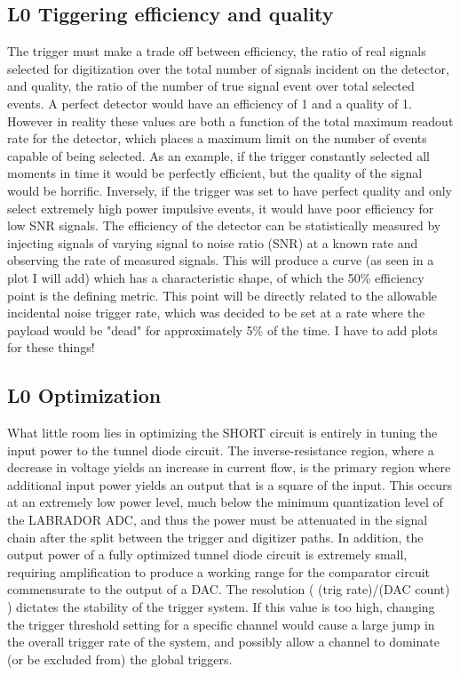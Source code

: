 	\subsection{L0 Tiggering efficiency and quality}
		The trigger must make a trade off between efficiency, the ratio of real signals selected for digitization over the total number of signals incident on the detector, and quality, the ratio of the number of true signal event over total selected events.  A perfect detector would have an efficiency of 1 and a quality of 1.  However in reality these values are both a function of the total maximum readout rate for the detector, which places a maximum limit on the number of events capable of being selected.  As an example, if the trigger constantly selected all moments in time it would be perfectly efficient, but the quality of the signal would be horrific.  Inversely, if the trigger was set to have perfect quality and only select extremely high power impulsive events, it would have poor efficiency for low SNR signals.  The efficiency of the detector can be statistically measured by injecting signals of varying signal to noise ratio (SNR) at a known rate and observing the rate of measured signals.  This will produce a curve (as seen in a plot I will add) which has a characteristic shape, of which the 50\% efficiency point is the defining metric.  This point will be directly related to the allowable incidental noise trigger rate, which was decided to be set at a rate where the payload would be "dead" for approximately 5\% of the time.  I have to add plots for these things!
		
	\subsection{L0 Optimization}
		What little room lies in optimizing the SHORT circuit is entirely in tuning the input power to the tunnel diode circuit.  The inverse-resistance region, where a decrease in voltage yields an increase in current flow, is the primary region where additional input power yields an output that is a square of the input.  This occurs at an extremely low power level, much below the minimum quantization level of the LABRADOR ADC, and thus the power must be attenuated in the signal chain after the split between the trigger and digitizer paths.  In addition, the output power of a fully optimized tunnel diode circuit is extremely small,	requiring amplification to produce a working range for the comparator circuit commensurate to the output of a DAC.  The resolution ( (trig rate)/(DAC count) ) dictates the stability of the trigger system.  If this value is too high, changing the trigger threshold setting for a specific channel would cause a large jump in the overall trigger rate of the system, and possibly allow a channel to dominate (or be excluded from) the global triggers.
		
